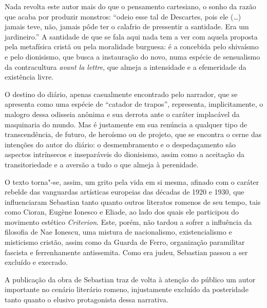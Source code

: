 Nada revolta este autor mais do que o pensamento cartesiano, o sonho da
razão que acaba por produzir monstros: ``odeio esse tal de Descartes,
pois ele (\ldots{}) jamais teve, não, jamais pôde ter o calafrio de
pressentir a santidade. Era um jardineiro.'' A santidade de que se fala
aqui nada tem a ver com aquela proposta pela metafísica cristã ou pela
moralidade burguesa: é a concebida pelo shivaísmo e pelo dionisismo, que
busca a instauração do novo, numa espécie de sensualismo da
contracultura \textit{avant la lettre}, que almeja a intensidade e a
efemeridade da existência livre.

O destino do diário, apenas casualmente encontrado pelo narrador, que se
apresenta como uma espécie de ``catador de trapos'', representa,
implicitamente, o malogro dessa odisseia anônima e sua derrota ante o
caráter implacável da maquinaria do mundo. Mas é justamente em sua
renúncia a qualquer tipo de transcendência, de futuro, de heroísmo ou de
projeto, que se encontra o cerne das intenções do autor do diário: o
desmembramento e o despedaçamento são aspectos intrínsecos e
inseparáveis do dionisismo, assim como a aceitação da transitoriedade e
a aversão a tudo o que almeja à perenidade.

O texto torna"-se, assim, um grito pela vida em si mesma, afinado com o
caráter rebelde das vanguardas artísticas europeias das décadas de 1920
e 1930, que influenciaram Sebastian tanto quanto outros literatos
romenos de seu tempo, tais como Cioran, Eugène Ionesco e Eliade, ao lado dos
quais ele participou do movimento estético \textit{Criterion}. Este, porém, não
tardou a sofrer a influência da filosofia de Nae Ionescu, uma mistura de
nacionalismo, existencialismo e misticismo cristão, assim como da Guarda
de Ferro, organização paramilitar fascista e ferrenhamente antissemita.
Como era judeu, Sebastian passou a ser excluído e execrado.

A publicação da obra de Sebastian traz de volta à atenção do público um
autor importante no cenário literário romeno, injustamente excluído da
posteridade tanto quanto o elusivo protagonista dessa narrativa. %


\pagebreak
\blankpage
